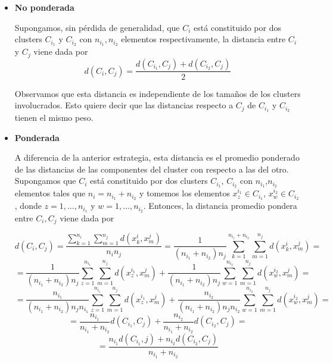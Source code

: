 \begin{itemize}
    \item \textbf{No ponderada} \newline

    Supongamos, sin pérdida de generalidad, que $C_{i}$ está constituido por dos clusters $C_{i_{1}}$ y $C_{i_{2}}$ con $n_{i_{1}},n_{i_{2}}$ elementos respectivamente, la distancia entre $C_{i}$ y $C_{j}$ viene dada por
    \[
    d(C_{i},C_{j}) = \frac{d(C_{i_{1}}, C_{j}) + d(C_{i_{2}}, C_{j})}{2}
    \]

    Observamos que esta distancia es independiente de los tamaños de los clusters involucrados. Esto quiere decir que las distancias respecto a $C_{j}$ de $C_{i_{1}}$ y $C_{i_{2}}$
    tienen el mismo peso. 

    \item \textbf{Ponderada} \newline
    
    A diferencia de la anterior estrategia, esta distancia es el promedio ponderado de las distancias de las componentes del cluster con respecto a las del otro. Supongamos que 
    $C_{i}$ está constituido por dos clusters $C_{i_{1}}$, $C_{i_{2}}$ con $n_{i_{1}}$,$n_{i_{2}}$ elementos tales que $n_{i} = n_{i_{1}}+n_{i_{2}}$ y tomemos los elementos $x^{i_{1}}_{z} \in C_{i_{1}}$, $x^{i_{2}}_{w} \in C_{i_{2}}$, donde 
    $z = 1,\dots,n_{i_{1}} $ y $w = 1,\dots,n_{i_{2}}$. Entonces, la distancia promedio pondera entre $C_{i},C_{j}$ viene dada por
    
    \[
    d(C_{i},C_{j}) = \frac{\sum_{k=1}^{n_{i}}\sum_{m=1}^{n_{j}}d(x^{i}_{k},x^{j}_{m})}{n_{i}n_{j}} = \frac{1}{(n_{i_{1}}+n_{i_{2}})n_{j}} \sum_{k=1}^{n_{i_{1}}+n_{i_{2}}} \sum_{m=1}^{n_{j}} d(x^{i}_{k},x^{j}_{m}) = 
    \]
    \[
    = \frac{1}{(n_{i_{1}}+n_{i_{2}})n_{j}} \sum_{z=1}^{n_{i_{1}}} \sum_{m=1}^{n_{j}} d(x^{i_{1}}_{z},x^{j}_{m}) + \frac{1}{(n_{i_{1}}+n_{i_{2}})n_{j}} \sum_{w=1}^{n_{i_{2}}} \sum_{m=1}^{n_{j}} d(x^{i_{2}}_{w},x^{j}_{m}) = 
    \]
    \[
    = \frac{n_{i_{1}}}{(n_{i_{1}}+n_{i_{2}})n_{j}n_{i_{1}}} \sum_{z=1}^{n_{i_{1}}} \sum_{m=1}^{n_{j}} d(x^{i_{1}}_{z},x^{j}_{m}) + \frac{n_{i_{2}}}{(n_{i_{1}}+n_{i_{2}})n_{j}n_{i_{2}}} \sum_{w=1}^{n_{i_{2}}} \sum_{m=1}^{n_{j}} d(x^{i_{2}}_{w},x^{j}_{m}) = 
    \]
    \[
    = \frac{n_{i_{1}}}{n_{i_{1}}+n_{i_{2}}} d(C_{i_{1}},C_{j}) + \frac{n_{i_{2}}}{n_{i_{1}}+n_{i_{2}}} d(C_{i_{2}},C_{j}) = 
    \]
    \[
    = \frac{n_{i_{1}}d(C_{i_{1}},j) + n_{i_{2}}d(C_{i_{2}},C_{j})}{n_{i_{1}}+n_{i_{2}}}
    \]

\end{itemize}

